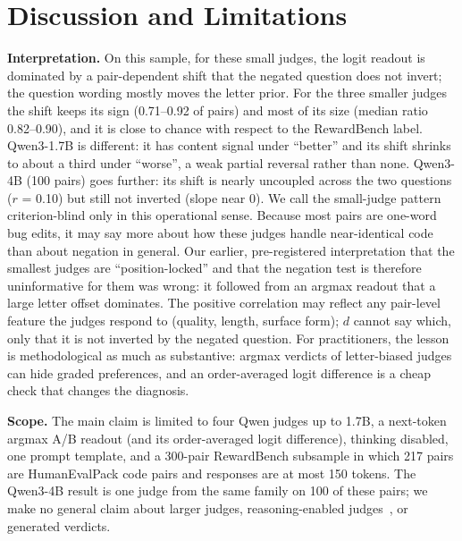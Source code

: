 \documentclass[conference]{IEEEtran}
\begin{document}
\section{Discussion and Limitations}\label{sec:disc}
\textbf{Interpretation.} On this sample, for these small judges, the logit readout is dominated by a
pair-dependent shift that the negated question does not invert; the question wording mostly moves the letter
prior. For the three smaller judges the shift keeps its sign (0.71--0.92 of pairs) and most of its size (median
ratio 0.82--0.90), and it is close to chance with respect to the RewardBench label. Qwen3-1.7B is different: it
has content signal under ``better'' and its shift shrinks to about a third under ``worse'', a weak partial
reversal rather than none. Qwen3-4B (100 pairs) goes further: its shift is nearly uncoupled across the two
questions ($r$ = 0.10) but still not inverted (slope near 0). We call the small-judge pattern criterion-blind only in this operational sense. Because most
pairs are one-word bug edits, it may say more about how these judges handle near-identical code than about
negation in general.
Our earlier, pre-registered interpretation that the smallest judges are ``position-locked'' and that the
negation test is therefore uninformative for them was wrong: it followed from an argmax readout that a large
letter offset dominates. The positive correlation may reflect any pair-level feature the judges respond to
(quality, length, surface form); $d$ cannot say which, only that it is not inverted by the negated question.
For practitioners, the lesson is methodological as much as substantive: argmax verdicts of letter-biased
judges can hide graded preferences, and an order-averaged logit difference is a cheap check that changes the
diagnosis.

\textbf{Scope.} The main claim is limited to four Qwen judges up to 1.7B, a next-token argmax A/B readout (and its
order-averaged logit difference), thinking disabled, one prompt template, and a 300-pair RewardBench
subsample in which 217 pairs are HumanEvalPack code pairs and responses are at most 150 tokens. The Qwen3-4B
result is one judge from the same family on 100 of these pairs; we make no general claim about larger judges,
reasoning-enabled judges~\cite{jayarao2025explicit}, or generated verdicts.
\end{document}
